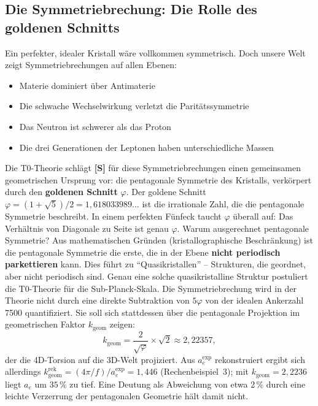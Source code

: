	\subsection{Die Symmetriebrechung: Die Rolle des goldenen Schnitts}
	Ein perfekter, idealer Kristall wäre vollkommen symmetrisch. Doch unsere Welt zeigt Symmetriebrechungen auf allen Ebenen:
	\begin{itemize}
		\item Materie dominiert über Antimaterie
		\item Die schwache Wechselwirkung verletzt die Paritätssymmetrie
		\item Das Neutron ist schwerer als das Proton
		\item Die drei Generationen der Leptonen haben unterschiedliche Massen
	\end{itemize}
	Die T0-Theorie schlägt \textbf{[S]} für diese Symmetriebrechungen einen gemeinsamen geometrischen Ursprung vor: die pentagonale Symmetrie des Kristalls, verkörpert durch den \textbf{goldenen Schnitt} \(\varphi\).
	Der goldene Schnitt \(\varphi = (1+\sqrt{5})/2 = 1{,}618033989\ldots\) ist die irrationale Zahl, die die pentagonale Symmetrie beschreibt. In einem perfekten Fünfeck taucht \(\varphi\) überall auf: Das Verhältnis von Diagonale zu Seite ist genau \(\varphi\).
	Warum ausgerechnet pentagonale Symmetrie? Aus mathematischen Gründen (kristallographische Beschränkung) ist die pentagonale Symmetrie die erste, die in der Ebene \textbf{nicht periodisch parkettieren} kann. Dies führt zu \enquote{Quasikristallen} -- Strukturen, die geordnet, aber nicht periodisch sind. Genau eine solche quasikristalline Struktur postuliert die T0-Theorie für die Sub-Planck-Skala.
	Die Symmetriebrechung wird in der Theorie nicht durch eine direkte Subtraktion von \(5\varphi\) von der idealen Ankerzahl 7500 quantifiziert. Sie soll sich stattdessen über die pentagonale Projektion im geometrischen Faktor \(k_\text{geom}\) zeigen:
	\begin{equation}
		k_\text{geom} = \frac{2}{\sqrt{\varphi}} \times \sqrt{2} \approx 2{,}22357,
	\end{equation}
	der die 4D-Torsion auf die 3D-Welt projiziert. Aus $a_e^{\exp}$ rekonstruiert ergibt sich allerdings $k_\text{geom}^\text{rek} = (4\pi/f)/a_e^{\exp} = 1{,}446$ (Rechenbeispiel~3); mit $k_\text{geom} = 2{,}2236$ liegt $a_e$ um $35\,\%$ zu tief. Eine Deutung als Abweichung von etwa 2\,\% durch eine leichte Verzerrung der pentagonalen Geometrie hält damit nicht.

